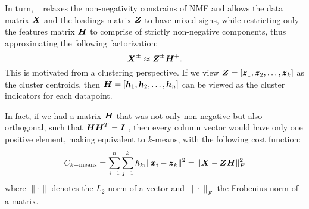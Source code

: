 \documentclass[10pt,journal,compsoc]{IEEEtran}
\begin{document}
In turn, \seminmf~\cite{ding2010convex}  relaxes the non-negativity constrains of NMF and allows the data matrix ${\boldsymbol X}$ and the loadings matrix ${\boldsymbol Z}$ to have mixed signs, while restricting only the features matrix ${\boldsymbol H}$ to comprise of strictly non-negative components, thus approximating the following factorization: 
\begin{equation}{\boldsymbol X}^{\pm} \approx {\boldsymbol Z^{\pm} \boldsymbol H^+}.
\label{eq:seminmf}
\end{equation}
This is motivated  from a clustering perspective. If we view ${{\boldsymbol{Z}} = [{\boldsymbol{z}_1}, {\boldsymbol{z}_2}, \ldots, {\boldsymbol{z}_k}]}$ as the cluster centroids, then ${{\boldsymbol{H}} = [{\boldsymbol{h}_1}, {\boldsymbol{h}_2}, \ldots, {\boldsymbol{h}_n}]}$ can be viewed as the cluster indicators for each datapoint. 

In fact, if we had a matrix ${\boldsymbol H}$ that was not only non-negative but also orthogonal, such that ${{\boldsymbol H \boldsymbol H^T}={\boldsymbol{I}}}$ \cite{ding2010convex}, then every column vector would have only one positive element, making \seminmf equivalent to $k$-means, with the following cost function:
\begin{equation}
C_{k-\text{means}} = \sum_{i=1}^n \sum_{j=1}^k h_{ki} \|{\boldsymbol{x}_i} - {\boldsymbol{z}_k}\|^2 = \| {\boldsymbol{X}} - {\boldsymbol Z \boldsymbol H} \|^2_F
\end{equation}
where $\|\cdot\|$ denotes the $L_2$-norm of a vector and $\|\cdot\|_F$ the Frobenius norm of a matrix.
\end{document}
